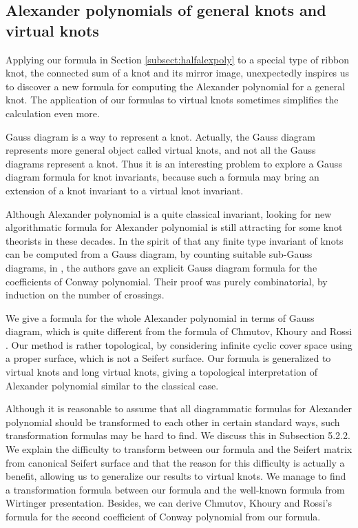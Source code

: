 \documentclass{amsart}
\theoremstyle{definition}
\theoremstyle{remark}
\numberwithin{equation}{subsection}
\begin{document}
\subsection{Alexander polynomials of general knots and virtual knots}\label{subsect:introduction2}

Applying our formula in Section \ref{subsect:halfalexpoly} to a special type of ribbon knot, the connected sum of a knot and its mirror image, unexpectedly inspires us to discover a new formula for computing the Alexander polynomial for a general knot. The application of our formulas to virtual knots sometimes simplifies the calculation even more.

Gauss diagram is a way to represent a knot. Actually, the Gauss diagram represents more general object called virtual knots, and not all the Gauss diagrams represent a knot. Thus it is an interesting problem to explore a Gauss diagram formula for knot invariants, because such a formula may bring an extension of a knot invariant to a virtual knot invariant.

Although Alexander polynomial is a quite classical invariant, looking for new algorithmatic formula for Alexander polynomial is still attracting for some knot theorists in these decades. In the spirit of \cite{GoussarovPolyakViro2000} that any finite type invariant of knots can be computed from a Gauss diagram, by counting suitable sub-Gauss diagrams, in \cite{ChmutovKhouryRossi2009}, the authors gave an explicit Gauss diagram formula for the coefficients of Conway polynomial. Their proof was purely combinatorial, by induction on the number of crossings.

We give a formula for the whole Alexander polynomial in terms of Gauss diagram, which is quite different from the formula of Chmutov, Khoury and Rossi \cite{ChmutovKhouryRossi2009}. Our method is rather topological, by considering infinite cyclic cover space using a proper surface, which is not a Seifert surface. Our formula is generalized to virtual knots and long virtual knots, giving a topological interpretation of Alexander polynomial similar to the classical case.

Although it is reasonable to assume that all diagrammatic formulas for Alexander polynomial should be transformed to each other in certain standard ways, such transformation formulas may be hard to find. We discuss this in Subsection 5.2.2. We explain the difficulty to transform between our formula and the Seifert matrix from canonical Seifert surface and that the reason for this difficulty is actually a benefit, allowing us to generalize our results to virtual knots. We manage to find a transformation formula between our formula and the well-known formula from Wirtinger presentation. Besides, we can derive Chmutov, Khoury and Rossi's formula\cite{ChmutovKhouryRossi2009} for the second coefficient of Conway polynomial from our formula.
\end{document}
